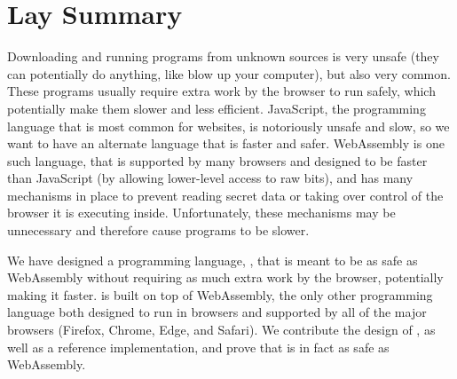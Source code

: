 \chapter{Lay Summary}
Downloading and running programs from unknown sources is very unsafe (they can potentially do anything, like blow up your computer), but also very common.
These programs usually require extra work by the browser to run safely, which potentially make them slower and less efficient.
JavaScript, the programming language that is most common for websites, is notoriously unsafe and slow, so we want to have an alternate language that is faster and safer.
WebAssembly is one such language, that is supported by many browsers and designed to be faster than JavaScript (by allowing lower-level access to raw bits), and has many mechanisms in place to prevent reading secret data or taking over control of the browser it is executing inside.
Unfortunately, these mechanisms may be unnecessary and therefore cause programs to be slower.

We have designed a programming language, \name, that is meant to be as safe as WebAssembly without requiring as much extra work by the browser, potentially making it faster.
\name is built on top of WebAssembly, the only other programming language both designed to run in browsers and supported by all of the major browsers (Firefox, Chrome, Edge, and Safari).
We contribute the design of \name, as well as a reference implementation, and prove that \name is in fact as safe as WebAssembly.
